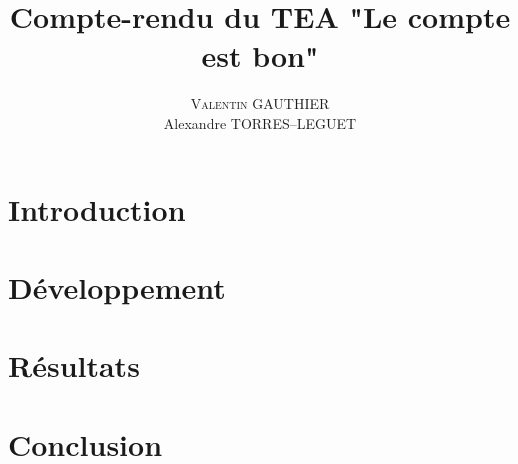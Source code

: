 \documentclass[11pt]{article}
\title{Compte-rendu du TEA "Le compte est bon"}
\author{\textsc{Valentin GAUTHIER}\\ Alexandre TORRES--LEGUET}
\begin{document}
\maketitle

\section{Introduction}

\section{Développement}

\section{Résultats}

\section{Conclusion}
\end{document}
